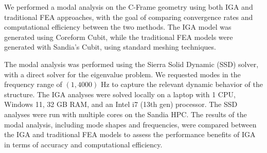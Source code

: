 \documentclass[12pt,report,justified]{SANDreport}
\begin{document}
We performed a modal analysis on the C-Frame geometry using both IGA and traditional FEA approaches, with the goal of comparing convergence rates and computational efficiency between the two methods.  The IGA model was generated using Coreform Cubit, while the traditional FEA models were generated with Sandia's Cubit, using standard meshing techniques.

The modal analysis was performed using the Sierra Solid Dynamic (SSD) solver, with a direct solver for the eigenvalue problem.  We requested modes in the frequency range of $(1, 4000)$ Hz to capture the relevant dynamic behavior of the structure.  
The IGA analyses were solved locally on a laptop with 1 CPU, Windows 11, 32 GB RAM, and an Intel i7 (13th gen) processor.  The SSD analyses were run with multiple cores on the Sandia HPC. The results of the modal analysis, including mode shapes and frequencies, were compared between the IGA and traditional FEA models to assess the performance benefits of IGA in terms of accuracy and computational efficiency.
\end{document}

